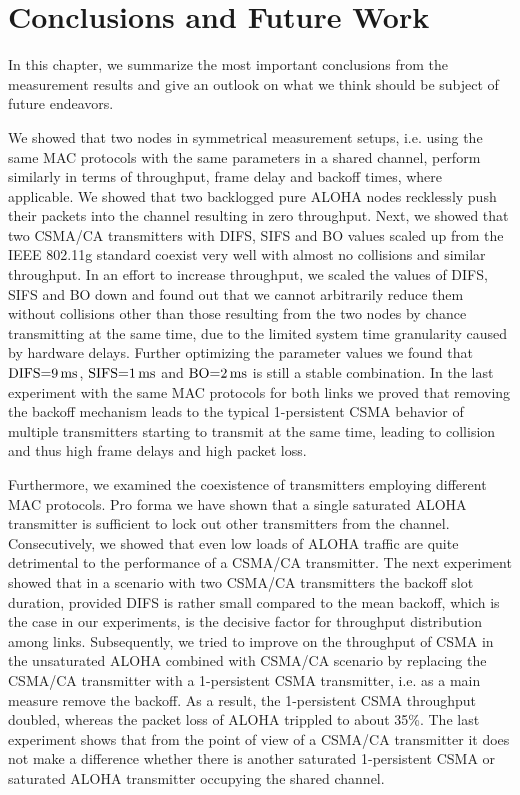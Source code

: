 \chapter{Conclusions and Future Work}
\label{ch:conclusions}

In this chapter, we summarize the most important conclusions from the measurement results and give an outlook on what we think should be subject of future endeavors.

We showed that two nodes in symmetrical measurement setups, i.e. using the same MAC protocols with the same parameters in a shared channel, perform similarly in terms of throughput, frame delay and backoff times, where applicable. We showed that two backlogged pure ALOHA nodes recklessly push their packets into the channel resulting in zero throughput. Next, we showed that two CSMA/CA transmitters with DIFS, SIFS and BO values scaled up from the IEEE 802.11g standard coexist very well with almost no collisions and similar throughput. In an effort to increase throughput, we scaled the values of DIFS, SIFS and BO down and found out that we cannot arbitrarily reduce them without collisions other than those resulting from the two nodes by chance transmitting at the same time, due to the limited system time granularity caused by hardware delays. Further optimizing the parameter values we found that $\text{DIFS=9\,ms}$, $\text{SIFS=1\,ms}$ and $\text{BO=2\,ms}$ is still a stable combination. In the last experiment with the same MAC protocols for both links we proved that removing the backoff mechanism leads to the typical 1-persistent CSMA behavior of multiple transmitters starting to transmit at the same time, leading to collision and thus high frame delays and high packet loss.

Furthermore, we examined the coexistence of transmitters employing different MAC protocols. Pro forma we have shown that a single saturated ALOHA transmitter is sufficient to lock out other transmitters from the channel. Consecutively, we showed that even low loads of ALOHA traffic are quite detrimental to the performance of a CSMA/CA transmitter. The next experiment showed that in a scenario with two CSMA/CA transmitters the backoff slot duration, provided DIFS is rather small compared to the mean backoff, which is the case in our experiments, is the decisive factor for throughput distribution among links. Subsequently, we tried to improve on the throughput of CSMA in the unsaturated ALOHA combined with CSMA/CA scenario by replacing the CSMA/CA transmitter with a 1-persistent CSMA transmitter, i.e. as a main measure remove the backoff. As a result, the 1-persistent CSMA throughput doubled, whereas the packet loss of ALOHA trippled to about 35\%. The last experiment shows that from the point of view of a CSMA/CA transmitter it does not make a difference whether there is another saturated 1-persistent CSMA or saturated ALOHA transmitter occupying the shared channel.    

